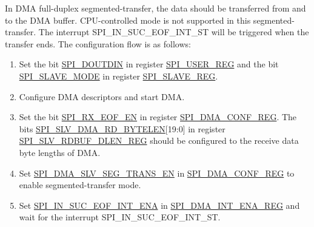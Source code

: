 \documentclass[main\_\_EN.tex]{subfiles}
\begin{document}
In DMA full-duplex segmented-transfer, the data should be transferred from and to the DMA buffer. CPU-controlled mode is not supported in this segmented-transfer. The interrupt SPI\_IN\_SUC\_EOF\_INT\_ST will be triggered when the transfer ends. The configuration flow is as follows:

\begin{enumerate}
    \item Set the bit \hyperref[fielddesc:SPIDOUTDIN]{SPI\_DOUTDIN} in register \hyperref[regdesc:SPIUSERREG]{SPI\_USER\_REG} and the bit \hyperref[fielddesc:SPISLAVEMODE]{SPI\_SLAVE\_MODE} in register \hyperref[regdesc:SPISLAVEREG]{SPI\_SLAVE\_REG}.
    \item Configure DMA descriptors and start DMA.

    \item Set the bit \hyperref[fielddesc:SPIRXEOFEN]{SPI\_RX\_EOF\_EN} in register \hyperref[regdesc:SPIDMACONFREG]{SPI\_DMA\_CONF\_REG}. The bits \hyperref[fielddesc:SPISLVDMARDBYTELEN]{SPI\_SLV\_DMA\_RD\_BYTELEN}[19:0] in register \hyperref[regdesc:SPISLVRDBUFDLENREG]{SPI\_SLV\_RDBUF\_DLEN\_REG} should be configured to the receive data byte lengths of DMA.

    \item Set \hyperref[fielddesc:SPIDMASLVSEGTRANSEN]{SPI\_DMA\_SLV\_SEG\_TRANS\_EN} in \hyperref[regdesc:SPIDMACONFREG]{SPI\_DMA\_CONF\_REG} to enable segmented-transfer mode.

    \item Set \hyperref[fielddesc:SPIINSUCEOFINTENA]{SPI\_IN\_SUC\_EOF\_INT\_ENA} in \hyperref[regdesc:SPIDMAINTENAREG]{SPI\_DMA\_INT\_ENA\_REG} and wait for the interrupt SPI\_IN\_SUC\_EOF\_INT\_ST.
\end{enumerate}
\end{document}
